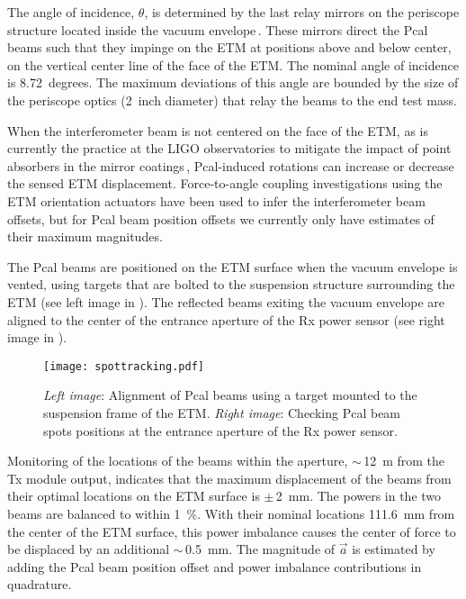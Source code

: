\documentclass[12pt,a4paper,final]{iopart}
\begin{document}
The angle of incidence, $\theta$, is determined by the last relay mirrors on the periscope structure located inside the vacuum envelope\,\cite{RSIpaper}.  These mirrors direct the Pcal beams such that they impinge on the ETM at positions above and  below center, on the vertical center line of the face of the ETM. The nominal angle of incidence is 8.72~degrees. The maximum deviations of this angle are bounded by the size of the periscope optics (2~inch diameter) that relay the beams to the end test mass.

When the interferometer beam is not centered on the face of the ETM, as is currently the practice at the LIGO observatories to mitigate the impact of point absorbers in the mirror coatings\,\cite{pointDefects}, Pcal-induced  rotations can increase or decrease the sensed ETM displacement.  Force-to-angle coupling investigations using the ETM orientation actuators have been used to infer the interferometer beam offsets, but for Pcal beam position offsets we currently only have estimates of their maximum magnitudes.

The Pcal beams are positioned on the ETM surface when the vacuum envelope is vented, using targets that are bolted to the suspension structure surrounding the ETM (see left image in ).  The reflected beams exiting the vacuum envelope are aligned to the center of the entrance aperture of the Rx power sensor (see right image in ).
%
\begin{figure}[t]%
    \begin{center}
    \texttt{[image: spottracking.pdf]}
    \caption{{\em Left image}: Alignment of Pcal beams using a target mounted to the suspension frame of the ETM.  {\em Right image}: Checking Pcal beam spots positions at the entrance aperture of the Rx power sensor.}
    \label{fig:PcalBeams}
    \end{center}
\end{figure}
%
Monitoring of the locations of the beams within the aperture, $\sim$\,\SI{12}{\meter} from the Tx module output, indicates that the maximum displacement of the beams from their optimal locations on the ETM surface is $\pm$\,2~mm.  The powers in the two beams are balanced to within \SI{1}{\percent}. With their nominal locations 111.6~mm from the center of the ETM surface,  this power imbalance causes the center of force to be displaced by an additional $\sim$\,0.5~mm. The magnitude of $\vec{a}$ is estimated by adding the Pcal beam position offset and power imbalance contributions in quadrature.
\end{document}
